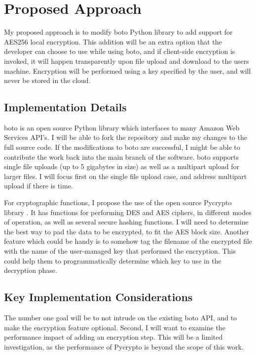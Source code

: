 \section{Proposed Approach}

My proposed approach is to modify boto Python library to add support for AES256 local encryption. 
This addition will be an extra option that the developer can choose to use while using boto, and if client-side encryption
is invoked, it will happen transparently upon file upload and download to the users machine. Encryption will be performed
using a key specified by the user, and will never be stored in the cloud.

\subsection{Implementation Details}

boto is an open source Python library which interfaces to many Amazon Web Services API's. I will be able to fork the repository and make my changes to the full source code.
If the modifications to boto are successful, I might be able to contribute the work back into the main branch of the software.
boto supports single file uploads (up to 5 gigabytes in size) as well as a multipart upload for larger files. I will focus first on the single file upload case, and address multipart upload if there is time.

For cryptographic functions, I propose the use of the open source Pycrypto library \cite{pycrypto}. It has functions for performing DES and AES ciphers, in different modes of operation, as well as several secure hashing functions.
I will need to determine the best way to pad the data to be encrypted, to fit the AES block size. Another feature which could be handy is to somehow tag the filename of the encrypted file with the name of the user-managed key that performed the encryption. This could help them to programmatically determine which key to use in the decryption phase.

\subsection{Key Implementation Considerations}
The number one goal will be to not intrude on the existing boto API, and to make the encryption feature optional. Second, I will want to examine the performance impact of adding an encryption step.
This will be a limited investigation, as the performance of Pycrypto is beyond the scope of this work.

